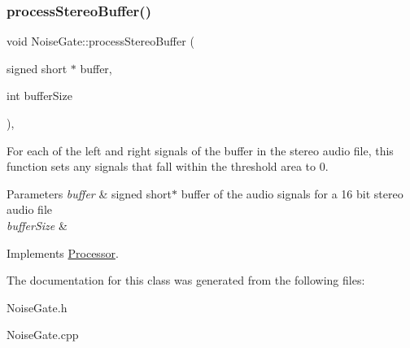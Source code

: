 \subsubsection{\texorpdfstring{process\+Stereo\+Buffer()}{processStereoBuffer()}\hspace{0.1cm}{\footnotesize\ttfamily [2/2]}}
{\footnotesize\ttfamily void Noise\+Gate\+::process\+Stereo\+Buffer (\begin{DoxyParamCaption}\item[{signed short $\ast$}]{buffer,  }\item[{int}]{buffer\+Size }\end{DoxyParamCaption})\hspace{0.3cm}{\ttfamily [override]}, {\ttfamily [virtual]}}



For each of the left and right signals of the buffer in the stereo audio file, this function sets any signals that fall within the threshold area to 0. 


\begin{DoxyParams}{Parameters}
{\em buffer} & signed short$\ast$ buffer of the audio signals for a 16 bit stereo audio file \\
\hline
{\em buffer\+Size} & \\
\hline
\end{DoxyParams}


Implements \hyperlink{classProcessor}{Processor}.



The documentation for this class was generated from the following files\+:\begin{DoxyCompactItemize}
\item 
Noise\+Gate.\+h\item 
Noise\+Gate.\+cpp\end{DoxyCompactItemize}
